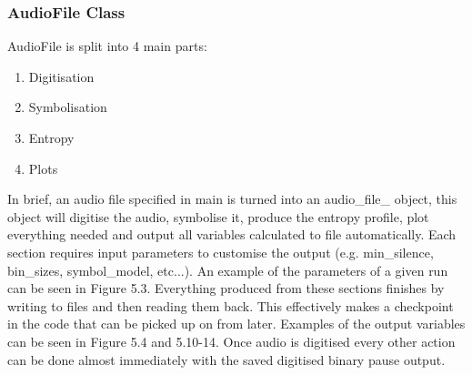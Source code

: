 \subsubsection{AudioFile Class}
AudioFile is split into 4 main parts:

\begin{enumerate}
	\item Digitisation
	\item Symbolisation
	\item Entropy
	\item Plots
\end{enumerate}

In brief, an audio file specified in main is turned into an audio\_file\_ object, this object will digitise the audio, symbolise it, produce the entropy profile, plot everything needed and output all variables calculated to file automatically. Each section requires input parameters to customise the output (e.g. min\_silence, bin\_sizes, symbol\_model, etc...). An example of the parameters of a given run can be seen in Figure 5.3. Everything produced from these sections finishes by writing to files and then reading them back. This effectively makes a checkpoint in the code that can be picked up on from later. Examples of the output variables can be seen in Figure 5.4 and 5.10-14. Once audio is digitised every other action can be done almost immediately with the saved digitised binary pause output. 


